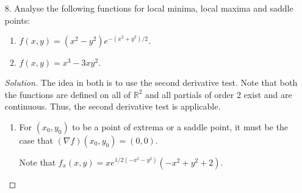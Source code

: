 \documentclass[12pt]{article}
\theoremstyle{definition}
\newenvironment{soln}{\begin{proof}[Solution]}{\end{proof}}
\begin{document}
\begin{itemize}
\begin{soln}
\begin{equation}
			\frac{\partial z}{\partial x} = -\dfrac{\cos(x + y)}{\cos(y + z)}.	
		\end{equation}
		Differentiating \cref{eq:random2} with respect to $y$ and keeping $x$ constant, we get
		\begin{equation} \tag{$\star\star$} \label{eq:random4}
			\cos(x + y) + \cos(y + z)\left(1 + \frac{\partial z}{\partial y}\right) = 0.
		\end{equation}
		Partially differentiating the above with respect to $x$ gives
		\begin{equation*} 
			-\sin(x + y) - \sin(y + z){\color{red}\left(\dfrac{\partial z}{\partial x}\right)\left(1 + \frac{\partial z}{\partial y}\right)} + \cos(y + z)\left(\dfrac{\partial^2z}{\partial x\partial y}\right) = 0.
		\end{equation*}
		Using \cref{eq:random3} and (a rearrangement of) \cref{eq:random4}, the red term can be replaced to get
		\begin{equation*} 
			-\sin(x + y) - \sin(y + z)\left(-\dfrac{\cos(x + y)}{\cos(y + z)}\right)^2 + \cos(y + z)\left(\dfrac{\partial^2z}{\partial x\partial y}\right) = 0.
		\end{equation*}
		Rearranging the above gives the answer as
		\begin{equation*} 
			\dfrac{\partial^2z}{\partial x\partial y} = \dfrac{\sin(x + y)}{\cos(y + z)} + \tan(y + z)\dfrac{\cos^2(x + y)}{\cos^2(y + z)}.
		\end{equation*}
	\end{soln}
	\newpage
	\item[8.] Analyse the following functions for local minima, local maxima and saddle points:
	\begin{enumerate}
		\item $f(x, y) = (x^2 - y^2)e^{-(x^2 + y^2)/2}.$
		\item $f(x, y) = x^3 - 3xy^2.$
	\end{enumerate}
	\begin{soln}
		The idea in both is to use the second derivative test. Note that both the functions are defined on all of $\mathbb{R}^2$ and all partials of order $2$ exist and are continuous. Thus, the second derivative test is applicable.
		\begin{enumerate}
			\item For $(x_0, y_0)$ to be a point of extrema or a saddle point, it must be the case that $(\nabla f)(x_0, y_0) = (0, 0).$

			Note that $f_x(x, y) =x e^{1 / 2\left(-x^{2}-y^{2}\right)}\left(-x^{2}+y^{2}+2\right).$


\end{enumerate}
\end{soln}
\end{itemize}
\end{document}
